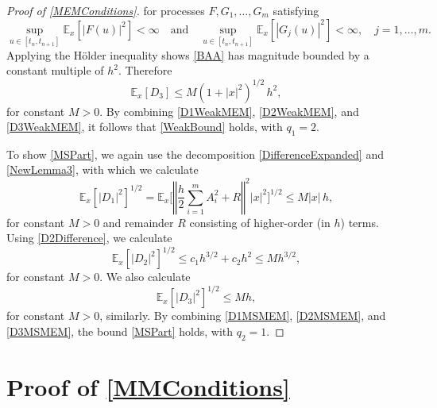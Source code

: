 \documentclass[onefignum]{siamart250211}
\providecommand{\abs}[1]{\left|#1\right|}
\providecommand{\norm}[1]{\left\Vert#1\right\Vert}
\begin{document}
\begin{proof}[Proof of \cref{MEMConditions}]
for processes $F,G_1,\ldots,G_m$ satisfying
\[\sup_{u\in[t_n,t_{n+1}]}\mathbb{E}_x\left[\abs{F(u)}^2\right]<\infty\quad\textrm{and}\quad\sup_{u\in[t_n,t_{n+1}]}\mathbb{E}_x\left[\abs{G_j(u)}^2\right]<\infty,\quad j=1,\ldots,m.\]
Applying the H\"older inequality shows \cref{BAA} has magnitude bounded by a constant multiple of $h^2$. Therefore
\begin{equation}\mathbb{E}_x[D_3]\leqslant M\left(1+\abs{x}^2\right)^{1/2}\,h^2,\label{D3WeakMEM}\end{equation}
for constant $M>0$. By combining \cref{D1WeakMEM}, \cref{D2WeakMEM}, and \cref{D3WeakMEM}, it follows that \cref{WeakBound} holds, with $q_1=2$.

To show \cref{MSPart}, we again use the decomposition \cref{DifferenceExpanded} and \cref{NewLemma3}, with which we calculate
\begin{equation}\mathbb{E}_x\left[\abs{D_1}^2\right]^{1/2}=\mathbb{E}_x\bigg[\norm{\frac{h}{2}\sum_{i=1}^mA_i^2+R}^2\abs{x}^2\bigg]^{1/2}\leqslant M\abs{x}\,h,\label{D1MSMEM}\end{equation}
for constant $M>0$ and remainder $R$ consisting of higher-order (in $h$) terms. Using \cref{D2Difference}, we calculate
\begin{equation}\mathbb{E}_x\left[\abs{D_2}^2\right]^{1/2}\leqslant c_1 h^{3/2} + c_2 h^2 \leqslant Mh^{3/2},\label{D2MSMEM}\end{equation}
for constant $M>0$. We also calculate
\begin{equation}\mathbb{E}_x\left[\abs{D_3}^2\right]^{1/2}\leqslant Mh,\label{D3MSMEM}\end{equation}
for constant $M>0$, similarly. By combining \cref{D1MSMEM}, \cref{D2MSMEM}, and \cref{D3MSMEM}, the bound \cref{MSPart} holds, with $q_2=1$.
\end{proof}


\section[Proof of MM errors]{Proof of \cref{MMConditions}}\label{ProofofMMConditions}
\end{document}
